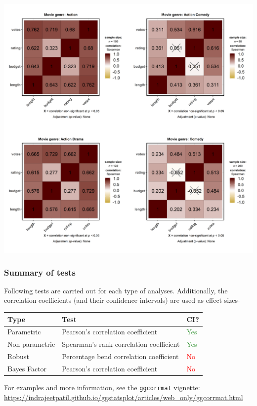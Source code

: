 \documentclass[]{article}
\begin{document}
\includegraphics[width=1\linewidth]{./figures/paper-ggcorrmat3-1}

\hypertarget{summary-of-tests-7}{%
\subsubsection{Summary of tests}\label{summary-of-tests-7}}

Following tests are carried out for each type of analyses. Additionally, the
correlation coefficients (and their confidence intervals) are used as effect
sizes-

\begin{longtable}[]{@{}lll@{}}
\toprule
Type & Test & CI?\tabularnewline
\midrule
\endhead
Parametric & Pearson's correlation coefficient & \textcolor{ForestGreen}{Yes}\tabularnewline
Non-parametric & Spearman's rank correlation coefficient & \textcolor{ForestGreen}{Yes}\tabularnewline
Robust & Percentage bend correlation coefficient & \textcolor{red}{No}\tabularnewline
Bayes Factor & Pearson's correlation coefficient & \textcolor{red}{No}\tabularnewline
\bottomrule
\end{longtable}

For examples and more information, see the \texttt{ggcorrmat} vignette:
\url{https://indrajeetpatil.github.io/ggstatsplot/articles/web_only/ggcorrmat.html}
\end{document}
